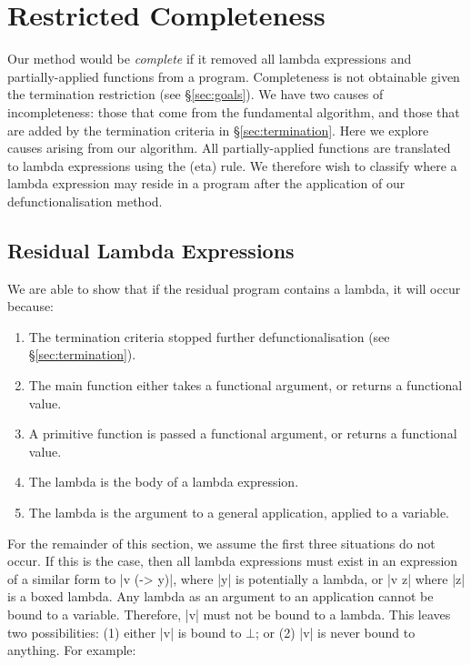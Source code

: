 \documentclass[preprint]{sigplanconf}
\begin{document}
\section{Restricted Completeness}
\label{sec:completeness}

Our method would be \textit{complete} if it removed all lambda expressions and partially-applied functions from a program. Completeness is not obtainable given the termination restriction (see \S\ref{sec:goals}). We have two causes of incompleteness: those that come from the fundamental algorithm, and those that are added by the termination criteria in \S\ref{sec:termination}. Here we explore causes arising from our algorithm. All partially-applied functions are translated to lambda expressions using the (eta) rule. We therefore wish to classify where a lambda expression may reside in a program after the application of our defunctionalisation method.

\subsection{Residual Lambda Expressions}

We are able to show that if the residual program contains a lambda, it will occur because:

\begin{enumerate}
\item The termination criteria stopped further defunctionalisation (see \S\ref{sec:termination}).
\item The main function either takes a functional argument, or returns a functional value.
\item A primitive function is passed a functional argument, or returns a functional value.
\item The lambda is the body of a lambda expression.
\item The lambda is the argument to a general application, applied to a variable.
\end{enumerate}

For the remainder of this section, we assume the first three situations do not occur. If this is the case, then all lambda expressions must exist in an expression of a similar form to |v (\x -> y)|, where |y| is potentially a lambda, or |v z| where |z| is a boxed lambda. Any lambda as an argument to an application cannot be bound to a variable. Therefore, |v| must not be bound to a lambda. This leaves two possibilities: (1) either |v| is bound to $\bot{}$; or (2) |v| is never bound to anything. For example:
\end{document}
